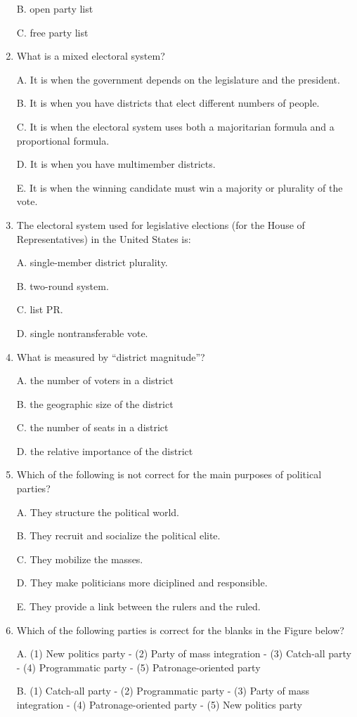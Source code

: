 \documentclass[
]{book}
\begin{document}
\begin{enumerate}
  B. open party list

  C. free party list
\item
  What is a mixed electoral system?

  A. It is when the government depends on the legislature and the president.

  B. It is when you have districts that elect different numbers of people.

  C. It is when the electoral system uses both a majoritarian formula and a proportional formula.

  D. It is when you have multimember districts.

  E. It is when the winning candidate must win a majority or plurality of the vote.
\item
  The electoral system used for legislative elections (for the House of Representatives) in the United States is:

  A. single-member district plurality.

  B. two-round system.

  C. list PR.

  D. single nontransferable vote.
\item
  What is measured by ``district magnitude''?

  A. the number of voters in a district

  B. the geographic size of the district

  C. the number of seats in a district

  D. the relative importance of the district
\item
  Which of the following is not correct for the main purposes of political parties?

  A. They structure the political world.

  B. They recruit and socialize the political elite.

  C. They mobilize the masses.

  D. They make politicians more diciplined and responsible.

  E. They provide a link between the rulers and the ruled.
\item
  Which of the following parties is correct for the blanks in the Figure below?

  A. (1) New politics party - (2) Party of mass integration - (3) Catch-all party - (4) Programmatic party - (5) Patronage-oriented party

  B. (1) Catch-all party - (2) Programmatic party - (3) Party of mass integration - (4) Patronage-oriented party - (5) New politics party


\end{enumerate}
\end{document}
